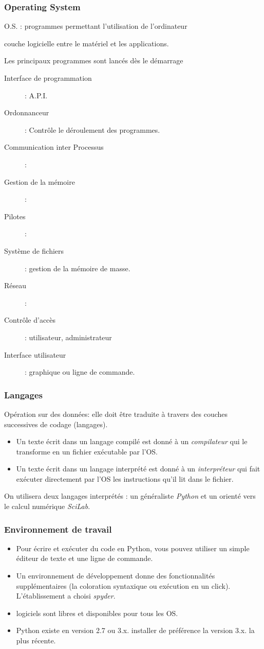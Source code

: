 \begin{frame}
\frametitle{Operating System}
O.S. : programmes permettant l'utilisation de l'ordinateur

couche logicielle entre le matériel et les applications. 

Les principaux programmes sont lancés dès le démarrage
\begin{description}
 \item[Interface de programmation]: A.P.I.
 \item[Ordonnanceur]: Contrôle le déroulement des programmes.
 \item[Communication inter Processus]:
 \item[Gestion de la mémoire]:
 \item[Pilotes]:
 \item[Système de fichiers]: gestion de la mémoire de masse.
 \item[Réseau]:
 \item[Contrôle d'accès]: utilisateur, administrateur
 \item[Interface utilisateur]: graphique ou ligne de commande.
\end{description}
\end{frame}

\begin{frame}
\frametitle{Langages}
Opération sur des données:  elle doit être traduite à travers des couches successives de codage (langages).
\begin{itemize}
 \item Un texte écrit dans un langage compilé est donné à un \emph{compilateur} qui le transforme en un fichier exécutable par l'OS.
 \item Un texte écrit dans un langage interprété est donné à un \emph{interpréteur} qui fait exécuter directement par l'OS les instructions qu'il lit dans le fichier.
\end{itemize}
On utilisera deux langages interprétés : un généraliste \emph{Python} et un orienté vers le calcul numérique \emph{SciLab}.
\end{frame}

\begin{frame}
\frametitle{Environnement de travail}
\begin{itemize}
  \item Pour écrire et exécuter du code en Python, vous pouvez utiliser un simple éditeur de texte et une ligne de commande. 
  \item Un environnement de développement donne des fonctionnalités supplémentaires (la coloration syntaxique ou exécution en un click). L'établissement a choisi \emph{spyder}.
  \item logiciels sont libres et disponibles pour tous les OS.
  \item Python existe en version 2.7 ou 3.x. installer de préférence la version 3.x. la plus récente.
\end{itemize}
\end{frame}



